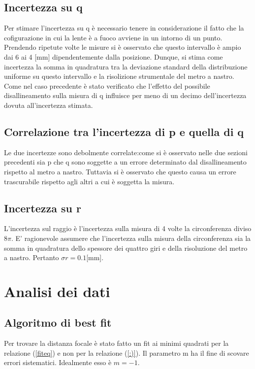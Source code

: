 \documentclass{article}
\begin{document}
\subsection{Incertezza su q}

Per stimare l'incertezza su q è necessario tenere in considerazione il fatto che la cofigurazione in cui la lente è a fuoco avviene in un intorno di un punto.
Prendendo ripetute volte le misure si è osservato che questo intervallo è ampio dai 6 ai 4 [mm] dipendentemente dalla posizione.
Dunque, si stima come incertezza la somma in quadratura tra la deviazione standard della distribuzione uniforme su questo intervallo e la risolizione strumentale del metro a nastro.
Come nel caso precedente è stato verificato che l'effetto del possibile disallineamento sulla misura di q influisce per meno di un decimo dell'incertezza dovuta all'incertezza stimata. 

\subsection{Correlazione tra l'incertezza di p e quella di q}
\label{ind}
Le due incertezze sono debolmente correlate:come si è osservato nelle due sezioni precedenti sia p che q sono soggette a un errore determinato dal disallineamento rispetto al metro a nastro. 
Tuttavia si  è osservato che questo causa un errore trascurabile rispetto agli altri a cui è soggetta la misura.


\subsection{Incertezza su r}
L'incertezza sul raggio è l'incertezza sulla misura di 4 volte la circonferenza diviso $8\pi$.
E' ragionevole assumere che l'incertezza sulla misura della circonferenza sia la somma in quadratura dello spessore dei quattro giri e della risoluzione del metro a nastro.
Pertanto $\sigma r= 0.1$[mm].


\section{Analisi dei dati}
\subsection{Algoritmo di best fit}
Per trovare la distanza focale è stato fatto un fit ai minimi quadrati per la relazione (\ref{fiteq}) e non per la relazione (\ref{:)}).
Il parametro m ha il fine di scovare errori sistematici. Idealmente esso è $m=-1$.
\end{document}
